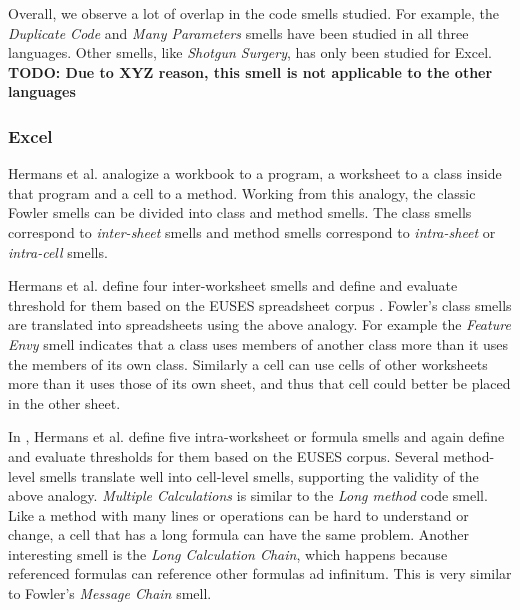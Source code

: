\documentclass[10pt,conference,compsocconf]{IEEEtran}
\newcommand{\todo}[1]{\textbf{TODO: #1}}
\begin{document}
 Overall, we observe a lot of overlap in the code smells studied. For example, the \emph{Duplicate Code} and \emph{Many Parameters} smells have been studied in all three languages. Other smells, like \emph{Shotgun Surgery}, has only been studied for Excel. \todo{Due to XYZ reason, this smell is not applicable to the other languages}
 
 \subsubsection{Excel}
Hermans et al. \cite{Hermans2012inter} \cite{Hermans2012intra} analogize a workbook to a program, a worksheet to a class inside that program and a cell to a method.
Working from this analogy, the classic Fowler smells can be divided into class and method smells.
The class smells correspond to \textit{inter-sheet} smells and method smells correspond to \textit{intra-sheet} or \textit{intra-cell} smells.

Hermans et al. \cite{Hermans2012inter} define four inter-worksheet smells and define and evaluate threshold for them based on the EUSES spreadsheet corpus \cite{fisher2005euses}.
Fowler's class smells are translated into spreadsheets using the above analogy. 
For example the \textit{Feature Envy} smell indicates that a class uses members of another class more than it uses the members of its own class.
Similarly a cell can use cells of other worksheets more than it uses those of its own sheet, and thus that cell could better be placed in the other sheet.

In \cite{Hermans2012intra}, Hermans et al. define five intra-worksheet or formula smells and again define and evaluate thresholds for them based on the EUSES corpus.
Several method-level smells translate well into cell-level smells, supporting the validity of the above analogy.
\textit{Multiple Calculations} is similar to the \textit{Long method} code smell.
Like a method with many lines or operations can be hard to understand or change, a cell that has a long formula can have the same problem.
Another interesting smell is the \textit{Long Calculation Chain}, which happens because referenced formulas can reference other formulas ad infinitum.
This is very similar to Fowler's \textit{Message Chain} smell.

%
\end{document}
